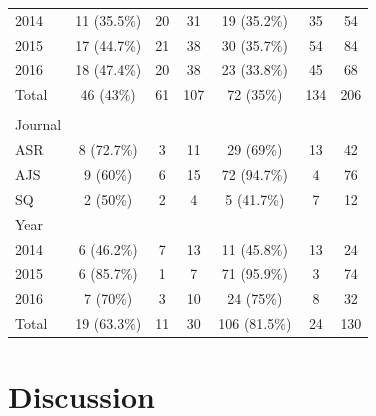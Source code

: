 \documentclass[
  12pt,
]{article}
\begin{document}
\begin{longtable}[t]{lcccccc}
\hspace{1em}\hspace{1em}2014 & 11 (35.5\%) & 20 & 31 & 19 (35.2\%) & 35 & 54\\
\hspace{1em}\hspace{1em}2015 & 17 (44.7\%) & 21 & 38 & 30 (35.7\%) & 54 & 84\\
\hspace{1em}\hspace{1em}2016 & 18 (47.4\%) & 20 & 38 & 23 (33.8\%) & 45 & 68\\
\hspace{1em}Total & 46 (43\%) & 61 & 107 & 72 (35\%) & 134 & 206\\
\addlinespace[0.3em]
\multicolumn{7}{l}{\textbf{‘Hyp'}}\\
\hspace{1em}Journal &  &  &  &  &  & \\
\hspace{1em}\hspace{1em}ASR & 8 (72.7\%) & 3 & 11 & 29 (69\%) & 13 & 42\\
\hspace{1em}\hspace{1em}AJS & 9 (60\%) & 6 & 15 & 72 (94.7\%) & 4 & 76\\
\hspace{1em}\hspace{1em}SQ & 2 (50\%) & 2 & 4 & 5 (41.7\%) & 7 & 12\\
\hspace{1em}Year &  &  &  &  &  & \\
\hspace{1em}\hspace{1em}2014 & 6 (46.2\%) & 7 & 13 & 11 (45.8\%) & 13 & 24\\
\hspace{1em}\hspace{1em}2015 & 6 (85.7\%) & 1 & 7 & 71 (95.9\%) & 3 & 74\\
\hspace{1em}\hspace{1em}2016 & 7 (70\%) & 3 & 10 & 24 (75\%) & 8 & 32\\
\hspace{1em}Total & 19 (63.3\%) & 11 & 30 & 106 (81.5\%) & 24 & 130\\*
\end{longtable}
\vspace{2cm}

\hypertarget{discussion}{%
\section{Discussion}\label{discussion}}
\end{document}
